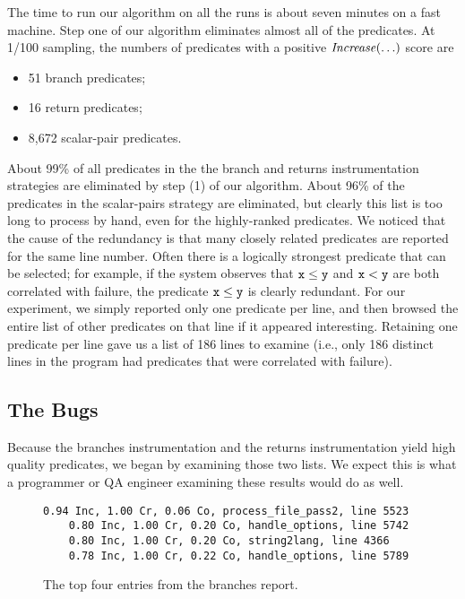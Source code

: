 The time to run our algorithm on all the runs is about seven minutes on
a fast machine.
Step one of our algorithm eliminates almost all of the predicates.  At
1/100 sampling, the numbers of predicates with a positive
$\mbox{\textit{Increase}}(\ldots)$ score are

\begin{itemize}
\item 51 branch predicates;

\item 16 return predicates;

\item 8,672 scalar-pair predicates.
\end{itemize}
About 99\% of all predicates in the the branch and returns
instrumentation strategies are eliminated by step (1) of our
algorithm.  About 96\% of the predicates in the scalar-pairs strategy are
eliminated, but clearly this list is too long to process by hand,
even for the highly-ranked predicates.  We noticed that the cause of the
redundancy is that many closely related predicates are reported for the
same line number.  Often there is a logically strongest predicate that can be
selected; for example, if the system observes that $\tt x \leq y$ and $\tt x < y$
are both correlated with failure, the predicate $\tt x \leq y$ is clearly redundant.  
For our experiment, we simply reported only one predicate per line,
and then browsed the entire list of other predicates on that line if it 
appeared interesting.  Retaining one predicate per line gave us a list
of 186 lines to examine (i.e., only 186 distinct lines in the program had
predicates that were correlated with failure).

\subsection{The Bugs}

Because the branches instrumentation and the returns instrumentation
yield high quality predicates, we began by examining those two lists.  We expect this is
what a programmer or QA engineer examining these results would do as well.

\begin{figure}
\centering
\begin{small}
  \begin{BVerbatim}[gobble=4]
    0.94 Inc, 1.00 Cr, 0.06 Co, process_file_pass2, line 5523
    0.80 Inc, 1.00 Cr, 0.20 Co, handle_options, line 5742
    0.80 Inc, 1.00 Cr, 0.20 Co, string2lang, line 4366
    0.78 Inc, 1.00 Cr, 0.22 Co, handle_options, line 5789
  \end{BVerbatim}
\end{small}

\caption{The top four entries from the branches report.}
\label{fig-report}
\end{figure}

